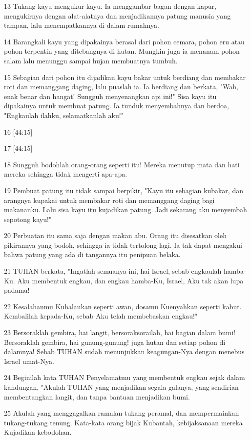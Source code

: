 \par 13 Tukang kayu mengukur kayu. Ia menggambar bagan dengan kapur, mengukirnya dengan alat-alatnya dan menjadikannya patung manusia yang tampan, lalu menempatkannya di dalam rumahnya.
\par 14 Barangkali kayu yang dipakainya berasal dari pohon cemara, pohon eru atau pohon terpentin yang ditebangnya di hutan. Mungkin juga ia menanam pohon salam lalu menunggu sampai hujan membuatnya tumbuh.
\par 15 Sebagian dari pohon itu dijadikan kayu bakar untuk berdiang dan membakar roti dan memanggang daging, lalu puaslah ia. Ia berdiang dan berkata, "Wah, enak benar dan hangat! Sungguh menyenangkan api ini!" Sisa kayu itu dipakainya untuk membuat patung. Ia tunduk menyembahnya dan berdoa, "Engkaulah ilahku, selamatkanlah aku!"
\par 16 [44:15]
\par 17 [44:15]
\par 18 Sungguh bodohlah orang-orang seperti itu! Mereka menutup mata dan hati mereka sehingga tidak mengerti apa-apa.
\par 19 Pembuat patung itu tidak sampai berpikir, "Kayu itu sebagian kubakar, dan arangnya kupakai untuk membakar roti dan memanggang daging bagi makananku. Lalu sisa kayu itu kujadikan patung. Jadi sekarang aku menyembah sepotong kayu!"
\par 20 Perbuatan itu sama saja dengan makan abu. Orang itu disesatkan oleh pikirannya yang bodoh, sehingga ia tidak tertolong lagi. Ia tak dapat mengakui bahwa patung yang ada di tangannya itu penipuan belaka.
\par 21 TUHAN berkata, "Ingatlah semuanya ini, hai Israel, sebab engkaulah hamba-Ku. Aku membentuk engkau, dan engkau hamba-Ku, Israel, Aku tak akan lupa padamu!
\par 22 Kesalahanmu Kuhalaukan seperti awan, dosamu Kuenyahkan seperti kabut. Kembalilah kepada-Ku, sebab Aku telah membebaskan engkau!"
\par 23 Bersoraklah gembira, hai langit, bersoraksorailah, hai bagian dalam bumi! Bersoraklah gembira, hai gunung-gunung! juga hutan dan setiap pohon di dalamnya! Sebab TUHAN sudah menunjukkan keagungan-Nya dengan menebus Israel umat-Nya.
\par 24 Beginilah kata TUHAN Penyelamatmu yang membentuk engkau sejak dalam kandungan, "Akulah TUHAN yang menjadikan segala-galanya, yang sendirian membentangkan langit, dan tanpa bantuan menjadikan bumi.
\par 25 Akulah yang menggagalkan ramalan tukang peramal, dan mempermainkan tukang-tukang tenung. Kata-kata orang bijak Kubantah, kebijaksanaan mereka Kujadikan kebodohan.
